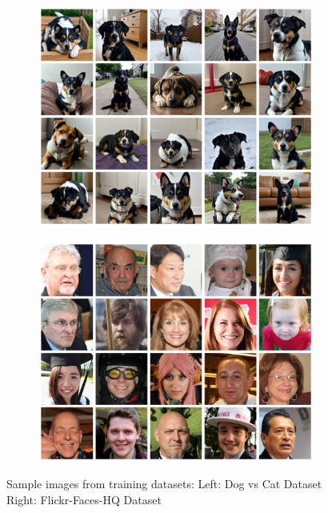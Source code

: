 \documentclass[12pt]{article}
\begin{document}
\begin{figure}[H]
  \centering
  \begin{subfigure}{0.5\textwidth}
    \includegraphics[width=1\textwidth]{dogs.png}
  \end{subfigure}%
  \begin{subfigure}{0.5\textwidth}
    \includegraphics[width=1\textwidth]{face.png}
  \end{subfigure}%
  \caption{Sample images from training datasets: Left: Dog vs Cat Dataset \cite{dog} Right: Flickr-Faces-HQ Dataset \cite{faces}}
\end{figure}
\end{document}
